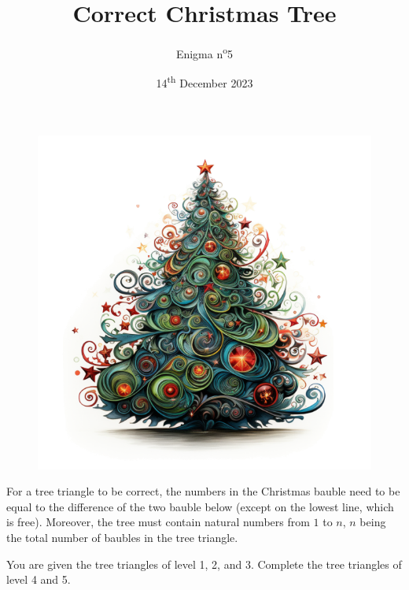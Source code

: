 \documentclass[a4paper, top=10mm]{article}
\title{\textbf{\huge{Correct Christmas Tree}}}
\author{Enigma n\textsuperscript{o}5}
\date{14\textsuperscript{th} December 2023}
\begin{document}
	\maketitle
	
	\begin{figure}
		\vspace{-2.5cm}
		\hspace{-0.75cm}
		\includegraphics[width=1.3\linewidth]{05_xmas_tree.png} 
	\end{figure}
	
	For a tree triangle to be correct, the numbers in the Christmas bauble need to be equal to the difference of the two bauble below (except on the lowest line, which is free).
	Moreover, the tree must contain natural numbers from $1$ to $n$, $n$ being the total number of baubles in the tree triangle.
	
	You are given the tree triangles of level 1, 2, and 3.
	Complete the tree triangles of level 4 and 5.
	
	
\end{document}

